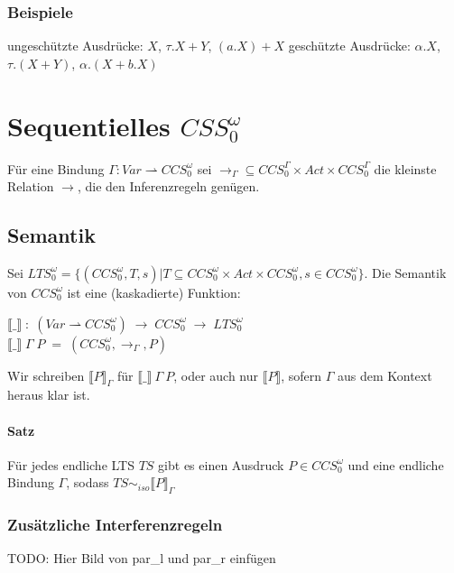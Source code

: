 \documentclass[a4paper,10pt, oneside]{book}
\begin{document}
\subsubsection{Beispiele}

 ungeschützte Ausdrücke: $X$, $\tau.X + Y$, $(a.X) + X$
\hfill
geschützte Ausdrücke: $\alpha.X$, $\tau.(X + Y)$, $\alpha.(X + b.X)$

\section{Sequentielles $CSS_0^{\omega}$}
Für eine Bindung $\Gamma: Var \rightharpoonup CCS_0^{\omega}$ sei $ \rightarrow_{\Gamma} \subseteq CCS_0^{\Gamma} \times Act \times CCS_0^{\Gamma}$ die kleinste Relation $\longrightarrow$, die den Inferenzregeln genügen.

\subsection{Semantik}
Sei $LTS_0^{\omega} = \{(CCS_0^{\omega}, T, s) | T \subseteq CCS_0^{\omega} \times Act \times CCS_0^{\omega}, s \in CCS_0^{\omega}\}$. Die Semantik von $CCS_0^{\omega}$ ist eine (kaskadierte) Funktion:\\
\begin{center}
 $\llbracket\_\rrbracket \; : \; (Var \rightharpoonup CCS_0^{\omega}) \; \rightarrow \; CCS_0^{\omega} \; \rightarrow \;  LTS_0^{\omega}$\\
 $\llbracket\_\rrbracket \; \Gamma \; P \; = \; (CCS_0^{\omega}, \rightarrow_{\Gamma}, P)$
\end{center}
Wir schreiben $\llbracket P \rrbracket_{\Gamma}$ für $\llbracket \_ \rrbracket \: \Gamma \: P$, oder auch nur $\llbracket P \rrbracket$, sofern $\Gamma$ aus dem Kontext heraus klar ist.

\paragraph{Satz}
Für jedes endliche LTS $TS$ gibt es einen Ausdruck $P \in CCS_0^{\omega}$ und eine endliche Bindung $\Gamma$, sodass $TS \sim_{iso} \llbracket P \rrbracket_{\Gamma}$

\subsubsection{Zusätzliche Interferenzregeln}
TODO: Hier Bild von par\_l und par\_r einfügen
\end{document}
